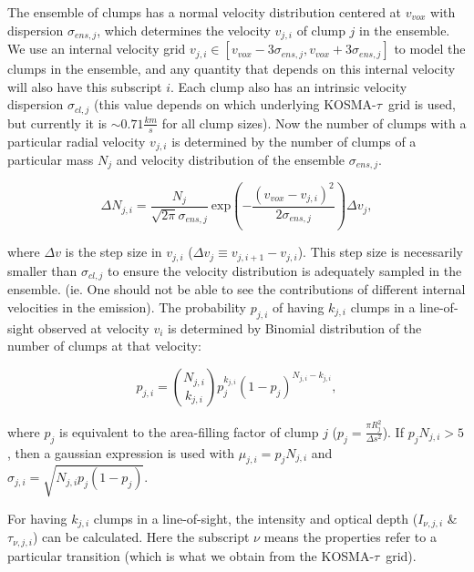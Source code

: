 \documentclass[a4paper]{article}
\newcommand{\kosmatau}{KOSMA-\(\tau\)}
\begin{document}
    The ensemble of clumps has a normal velocity distribution centered at \(v_{vox}\) with dispersion \(\sigma_{ens, j}\), which determines the velocity \(v_{j,i}\) of clump \(j\) in the ensemble.
    We use an internal velocity grid \(v_{j,i} \in [v_{vox} - 3 \sigma_{ens,j}, v_{vox} + 3 \sigma_{ens,j}]\) to model the clumps in the ensemble, and any quantity that depends on this internal velocity will also have this subscript \(i\).
    Each clump also has an intrinsic velocity dispersion \(\sigma_{cl,j}\) (this value depends on which underlying \kosmatau \ grid is used, but currently it is \(\sim0.71 \frac{km}{s}\) for all clump sizes).
    Now the number of clumps with a particular radial velocity \(v_{j,i}\) is determined by the number of clumps of a particular mass \(N_j\) and velocity distribution of the ensemble \(\sigma_{ens,j}\).

    \[
    \Delta N_{j,i} = \frac{N_j}{\sqrt{2 \pi} \sigma_{ens,j}} \ \mathrm{exp} \left( -\frac{(v_{vox}-v_{j,i})^2}{2 \sigma_{ens, j}} \right) \Delta v_j,
    \]

    where \(\Delta v\) is the step size in \(v_{j,i}\) (\(\Delta v_j \equiv v_{j,i+1} - v_{j,i}\)).
    This step size is necessarily smaller than \(\sigma_{cl,j}\) to ensure the velocity distribution is adequately sampled in the ensemble.
    (ie. One should not be able to see the contributions of different internal velocities in the emission).
    The probability \(p_{j,i}\) of having \(k_{j,i}\) clumps in a line-of-sight observed at velocity \(v_i\) is determined by Binomial distribution of the number of clumps at that velocity:

    \[
    p_{j,i} = \binom{N_{j,i}}{k_{j,i}} p_j^{k_{j,i}} (1-p_j)^{N_{j,i}-k_{j,i}},
    \]

    where \(p_j\) is equivalent to the area-filling factor of clump \(j\) (\(p_j = \frac{\pi R_{j}^2}{\Delta s^2}\)).
    If \(p_j N_{j,i}>5\), then a gaussian expression is used with \(\mu_{j,i} = p_j N_{j,i}\) and \(\sigma_{j,i} = \sqrt{N_{j,i} p_j (1-p_j)}\).

    For having \(k_{j,i}\) clumps in a line-of-sight, the intensity and optical depth (\(I_{\nu,j,i}\) \& \(\tau_{\nu,j,i}\)) can be calculated.
    Here the subscript \(\nu\) means the properties refer to a particular transition (which is what we obtain from the \kosmatau \ grid).
\end{document}
